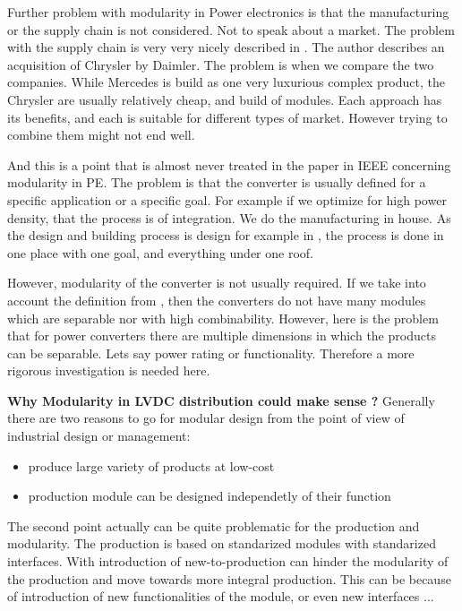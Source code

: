 \documentclass[]{scrartcl}
\begin{document}
Further problem with modularity in Power electronics is that the manufacturing or the supply chain is not considered. Not to speak about a market. The problem with the supply chain is very very nicely described in \cite{Fine2005}. The author describes an acquisition of Chrysler by Daimler. The problem is when we compare the two companies. While Mercedes is build as one very luxurious complex product, the Chrysler are usually relatively cheap, and build of modules. Each approach has its benefits, and each is suitable for different types of market. However trying to combine them might not end well. 

And this is a point that is almost never treated in the paper in IEEE concerning modularity in PE. The problem is that the converter is usually defined for a specific application or a specific goal. For example if we optimize for high power density, that the process is of integration. We do the manufacturing in house. As the design and building process is design for example in \cite{Abraham2005}, the process is done in one place with one goal, and everything under one roof. 

However, modularity of the converter is not usually required. If we take into account the definition from \cite{Salvador2007}, then the converters do not have many modules which are separable nor with high combinability. However, here is the problem that for power converters there are multiple dimensions in which the products can be separable. Lets say power rating or functionality. Therefore a more rigorous investigation is needed here. 


\textbf{Why Modularity in LVDC distribution could make sense ?} 
Generally there are two reasons to go for modular design from the point of view of industrial design or management\cite{Huang1998}:
\begin{itemize}
	\item produce large variety of products at low-cost
	\item production module can be designed independetly of their function
\end{itemize}

The second point actually can be quite problematic for the production and modularity. The production is based on standarized modules with standarized interfaces. With introduction of new-to-production \cite{JulianaHsuanMikkola2003} can hinder the modularity of the production and move towards more integral production. This can be because of introduction of new functionalities of the module, or even new interfaces ... 
\end{document}
